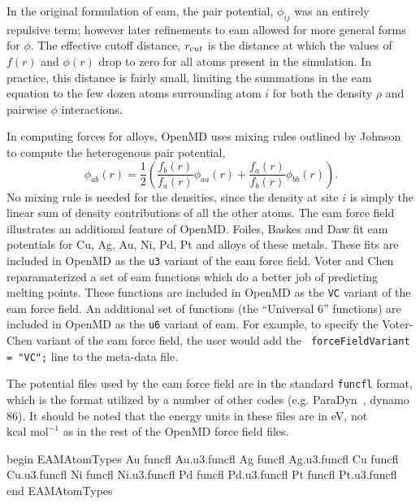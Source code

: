 \documentclass[]{book}
\begin{document}
In the original formulation of {\sc eam}\cite{Daw84}, the pair
potential, $\phi_{ij}$ was an entirely repulsive term; however later
refinements to {\sc eam} allowed for more general forms for
$\phi$.\cite{Daw89} The effective cutoff distance, $r_{{\text cut}}$
is the distance at which the values of $f(r)$ and $\phi(r)$ drop to
zero for all atoms present in the simulation.  In practice, this
distance is fairly small, limiting the summations in the {\sc eam}
equation to the few dozen atoms surrounding atom $i$ for both the
density $\rho$ and pairwise $\phi$ interactions.

In computing forces for alloys, OpenMD uses mixing rules outlined by
Johnson~\cite{johnson89} to compute the heterogenous pair potential,
\begin{equation}
\label{eq:johnson}
\phi_{ab}(r)=\frac{1}{2}\left(
\frac{f_{b}(r)}{f_{a}(r)}\phi_{aa}(r)+
\frac{f_{a}(r)}{f_{b}(r)}\phi_{bb}(r)
\right).
\end{equation}
No mixing rule is needed for the densities, since the density at site
$i$ is simply the linear sum of density contributions of all the other
atoms.
The {\sc eam} force field illustrates an additional feature of {\sc
OpenMD}.  Foiles, Baskes and Daw fit {\sc eam} potentials for Cu, Ag,
Au, Ni, Pd, Pt and alloys of these metals.\cite{FBD86} These fits are
included in {\sc OpenMD} as the {\tt u3} variant of the {\sc eam} force
field.  Voter and Chen reparamaterized a set of {\sc eam} functions
which do a better job of predicting melting points.\cite{Voter:87}
These functions are included in {\sc OpenMD} as the {\tt VC} variant of
the {\sc eam} force field.  An additional set of functions (the
``Universal 6'' functions) are included in {\sc OpenMD} as the {\tt u6}
variant of {\sc eam}.  For example, to specify the Voter-Chen variant
of the {\sc eam} force field, the user would add the {\tt
forceFieldVariant = "VC";} line to the meta-data file.

The potential files used by the {\sc eam} force field are in the
standard {\tt funcfl} format, which is the format utilized by
a number of other codes (e.g. ParaDyn~\cite{Paradyn}, {\sc dynamo
  86}).  It should be noted that the energy units in these files are
in eV, not $\mbox{kcal mol}^{-1}$ as in the rest of the {\sc OpenMD}
force field files.

\begin{code}[caption={[An example of a EAMAtomTypes block.] A
simple example of a EAMAtomTypes block. Here the only data provided is
the name of a DYNAMO86 {\tt funcfl} file which contains the raw data for spline
interpolations for the density, functional, and pair potential.},
label={sch:EAMAtomTypes}]
begin EAMAtomTypes
Au      funcfl  Au.u3.funcfl
Ag      funcfl  Ag.u3.funcfl
Cu      funcfl  Cu.u3.funcfl
Ni      funcfl  Ni.u3.funcfl
Pd      funcfl  Pd.u3.funcfl
Pt      funcfl  Pt.u3.funcfl
end EAMAtomTypes
\end{code}
\end{document}
